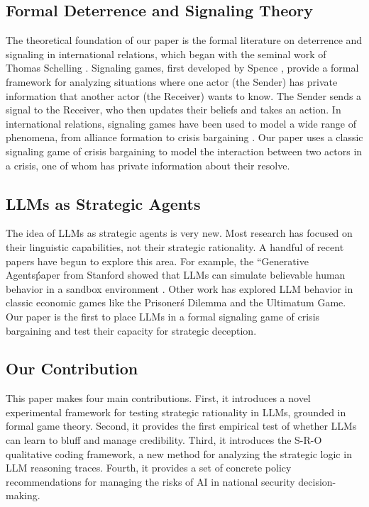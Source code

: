 \documentclass[12pt]{article}
\theoremstyle{plain}
\theoremstyle{definition}
\begin{document}
\subsection{Formal Deterrence and Signaling Theory}

The theoretical foundation of our paper is the formal literature on deterrence and signaling in international relations, which began with the seminal work of Thomas Schelling \citep{Schelling1960}. Signaling games, first developed by Spence \citep{Spence1973}, provide a formal framework for analyzing situations where one actor (the Sender) has private information that another actor (the Receiver) wants to know. The Sender sends a signal to the Receiver, who then updates their beliefs and takes an action. In international relations, signaling games have been used to model a wide range of phenomena, from alliance formation to crisis bargaining \citep{Fearon1994, Morrow1989}. Our paper uses a classic signaling game of crisis bargaining to model the interaction between two actors in a crisis, one of whom has private information about their resolve.

\subsection{LLMs as Strategic Agents}

The idea of LLMs as strategic agents is very new. Most research has focused on their linguistic capabilities, not their strategic rationality. A handful of recent papers have begun to explore this area. For example, the ``Generative Agents\'\' paper from Stanford showed that LLMs can simulate believable human behavior in a sandbox environment \citep{Park2023}. Other work has explored LLM behavior in classic economic games like the Prisoner\'s Dilemma and the Ultimatum Game. Our paper is the first to place LLMs in a formal signaling game of crisis bargaining and test their capacity for strategic deception.

\subsection{Our Contribution}

This paper makes four main contributions. First, it introduces a novel experimental framework for testing strategic rationality in LLMs, grounded in formal game theory. Second, it provides the first empirical test of whether LLMs can learn to bluff and manage credibility. Third, it introduces the S-R-O qualitative coding framework, a new method for analyzing the strategic logic in LLM reasoning traces. Fourth, it provides a set of concrete policy recommendations for managing the risks of AI in national security decision-making.
\end{document}

